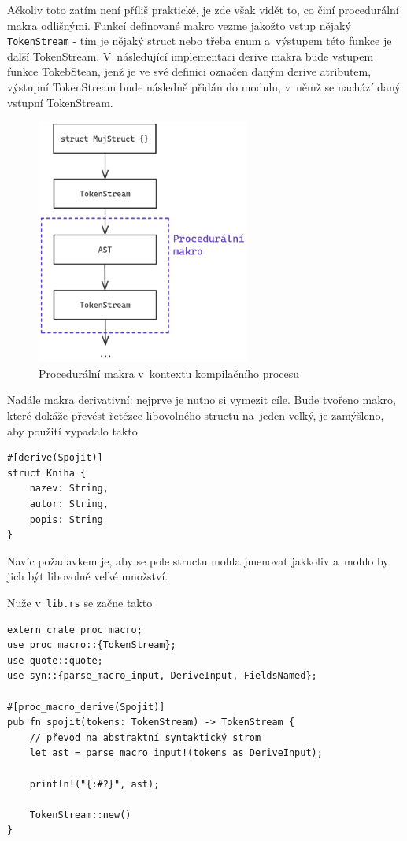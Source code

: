 \documentclass[a4paper, 12pt]{article} %
\newcommand{\rust}[1]{\texttt{#1}}
\begin{document}
			Ačkoliv toto zatím není příliš praktické, je zde však vidět to, co činí procedurální makra odlišnými. Funkcí definované makro vezme jakožto vstup nějaký \rust{TokenStream} - tím je nějaký struct nebo třeba enum a~výstupem této funkce je další TokenStream. V~následující implementaci derive makra bude vstupem funkce TokebStean, jenž je ve své definici označen daným derive atributem, výstupní TokenStream bude následně přidán do modulu, v~němž se nachází daný vstupní TokenStream.
			\begin{center}
				\begin{figure}[H]
					\centering
					\includegraphics[width=7cm]{proc}
					\caption{Procedurální makra v~kontextu kompilačního procesu}
					\label{fig:proc}
				\end{figure}
			\end{center}
			
			Nadále makra derivativní: nejprve je nutno si vymezit cíle. Bude tvořeno makro, které dokáže převést řetězce libovolného structu na~jeden velký, je zamýšleno, aby použití vypadalo takto
			\begin{verbatim}
#[derive(Spojit)]
struct Kniha {
	nazev: String,
	autor: String,
	popis: String
}
			\end{verbatim}

			Navíc požadavkem je, aby se pole structu mohla jmenovat jakkoliv a~mohlo by jich být libovolně velké množství.

			Nuže v~\texttt{lib.rs} se začne takto
			\begin{verbatim}
extern crate proc_macro;
use proc_macro::{TokenStream};
use quote::quote;
use syn::{parse_macro_input, DeriveInput, FieldsNamed};

#[proc_macro_derive(Spojit)]
pub fn spojit(tokens: TokenStream) -> TokenStream {
	// převod na abstraktní syntaktický strom
	let ast = parse_macro_input!(tokens as DeriveInput);
	
	println!("{:#?}", ast);

	TokenStream::new()
}
			\end{verbatim}
			
\end{document}

